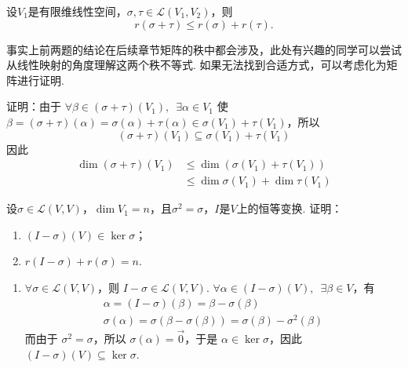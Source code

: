\begin{exercise}
\begin{exgroup}
        \item 设$V_1$是有限维线性空间，$\sigma,\tau\in \mathcal{L}(V_1,V_2)$，则
        \[r(\sigma+\tau) \leqslant r(\sigma)+r(\tau).\]

        事实上前两题的结论在后续章节矩阵的秩中都会涉及，此处有兴趣的同学可以尝试从线性映射的角度理解这两个秩不等式. 如果无法找到合适方式，可以考虑化为矩阵进行证明.
        \begin{answer}
            证明：由于 $ \forall \beta \in (\sigma + \tau)(V_1),\enspace \exists \alpha \in V_1 $ 使 $ \beta = (\sigma + \tau)(\alpha) = \sigma(\alpha) + \tau(\alpha) \in \sigma(V_1) + \tau(V_1) $，所以
          \[ (\sigma + \tau)(V_1) \subseteq \sigma(V_1) + \tau(V_1) \]
          因此
          \begin{align*}
              \dim(\sigma + \tau)(V_1) & \leqslant \dim(\sigma(V_1) + \tau(V_1))     \\
                                       & \leqslant \dim \sigma(V_1) + \dim \tau(V_1)
          \end{align*}
        \end{answer}
        \item 设$\sigma\in \mathcal{L}(V,V)$，$\dim V_1=n$，且$\sigma^2=\sigma$，$I$是$V$上的恒等变换. 证明：
        \begin{enumerate}
            \item $(I-\sigma)(V) \in \ker\sigma$；

            \item $r(I-\sigma)+r(\sigma)=n$.
        \end{enumerate}

        \begin{answer}
            \begin{enumerate}
                \item \label{item:5:C:6:1}
                      $ \forall \sigma \in \mathcal{L}(V, V) $，则 $ I - \sigma \in \mathcal{L}(V, V) $. $ \forall \alpha \in (I - \sigma)(V),\enspace \exists \beta \in V $，有
                      \begin{gather*}
                          \alpha = (I - \sigma)(\beta) = \beta - \sigma(\beta) \\
                          \sigma(\alpha) = \sigma(\beta - \sigma(\beta)) = \sigma(\beta) - \sigma^2(\beta)
                      \end{gather*}
                      而由于 $ \sigma^2 = \sigma $，所以 $ \sigma(\alpha) = \vec{0} $，于是 $ \alpha \in \ker \sigma $，因此 $ (I - \sigma)(V) \subseteq \ker \sigma $.


\end{enumerate}
\end{answer}
\end{exgroup}
\end{exercise}
